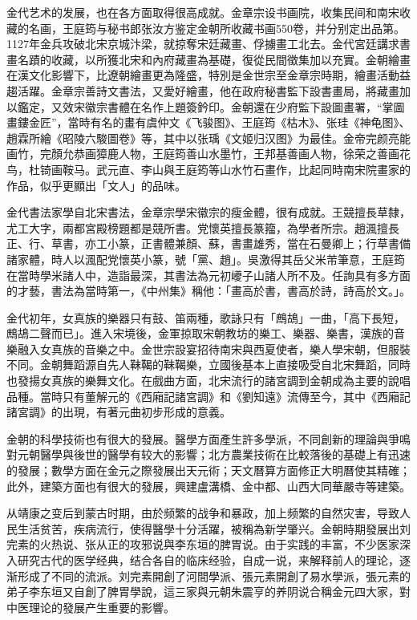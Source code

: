 金代艺术的发展，也在各方面取得很高成就。金章宗设书画院，收集民间和南宋收藏的名画，王庭筠与秘书郎张汝方鉴定金朝所收藏书画550卷，并分别定出品第。1127年金兵攻破北宋京城汴梁，就掠奪宋廷藏畫、俘擄畫工北去。金代宮廷講求書畫名蹟的收藏，以所獲北宋和內府藏畫為基礎，復從民間徵集加以充實。金朝繪畫在漢文化影響下，比遼朝繪畫更為隆盛，特別是金世宗至金章宗時期，繪畫活動益趨活躍。金章宗善詩文書法，又愛好繪畫，他在政府秘書監下設書畫局，將藏畫加以鑑定，又效宋徽宗書體在名作上題簽鈐印。金朝還在少府監下設圖畫署，“掌圖畫鏤金匠”，當時有名的畫有虞仲文《飞骏图》、王庭筠《枯木》、张珪《神龟图》、趙霖所繪《昭陵六駿圖卷》等，其中以张瑀《文姬归汉图》为最佳。金帝完颜亮能画竹，完顏允恭画獐鹿人物，王庭筠善山水墨竹，王邦基善画人物，徐荣之善画花鸟，杜锜画鞍马。武元直、李山與王庭筠等山水竹石畫作，比起同時南宋院畫家的作品，似乎更顯出「文人」的品味。

金代書法家學自北宋書法，金章宗學宋徽宗的瘦金體，很有成就。王競擅長草隸，尤工大字，兩都宮殿榜題都是競所書。党懷英擅長篆籀，為學者所宗。趙渢擅長正、行、草書，亦工小篆，正書體兼顏、蘇，書畫雄秀，當在石曼卿上；行草書備諸家體，時人以渢配党懷英小篆，號「黨、趙」。吳激得其岳父米芾筆意，王庭筠在當時學米諸人中，造詣最深，其書法為元初巙子山諸人所不及。任詢具有多方面的才藝，書法為當時第一，《中州集》稱他：「畫高於書，書高於詩，詩高於文。」。

金代初年，女真族的樂器只有鼓、笛兩種，歌詠只有「鷓鴣」一曲，「高下長短，鷓鴣二聲而已」。進入宋境後，金軍掠取宋朝教坊的樂工、樂器、樂書，漢族的音樂融入女真族的音樂之中。金世宗設宴招待南宋與西夏使者，樂人學宋朝，但服裝不同。金朝舞蹈源自先人靺鞨的靺鞨樂，立國後基本上直接吸受自北宋舞蹈，同時也發揚女真族的樂舞文化。在戲曲方面，北宋流行的諸宮調到金朝成為主要的說唱品種。當時只有董解元的《西廂記諸宮調》和《劉知遠》流傳至今，其中《西廂記諸宮調》的出現，有著元曲初步形成的意義。

金朝的科學技術也有很大的發展。醫學方面產生許多學派，不同創新的理論與爭鳴對元朝醫學與後世的醫學有较大的影響；北方農業技術在比較落後的基礎上有迅速的發展；數學方面在金元之際發展出天元術；天文曆算方面修正大明曆使其精確；此外，建築方面也有很大的發展，興建盧溝橋、金中都、山西大同華嚴寺等建築。

从靖康之变后到蒙古时期，由於频繁的战争和暴政，加上频繁的自然灾害，导致人民生活贫苦，疾病流行，使得醫學十分活躍，被稱為新学肇兴。金朝時期發展出刘完素的火热说、张从正的攻邪说與李东垣的脾胃说。由于实践的丰富，不少医家深入研究古代的医学经典，结合各自的临床经验，自成一说，来解释前人的理论，逐渐形成了不同的流派。刘完素開創了河間學派、張元素開創了易水學派，張元素的弟子李东垣又自創了脾胃學說，這三家與元朝朱震亨的养阴说合稱金元四大家，對中医理论的發展产生重要的影響。

